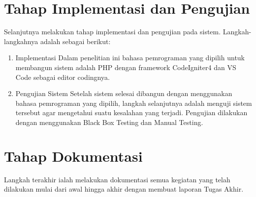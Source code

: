 \section{Tahap Implementasi dan Pengujian}
Selanjutnya melakukan tahap implementasi dan pengujian pada sistem. Langkah-langkahnya adalah sebagai berikut:
\begin{enumerate}
	\item Implementasi Dalam penelitian ini bahasa pemrograman yang dipilih untuk membangun sistem adalah PHP dengan framework CodeIgniter4 dan VS Code sebagai editor codingnya.
	\item Pengujian Sistem Setelah sistem selesai dibangun dengan menggunakan bahasa pemrograman yang dipilih, langkah selanjutnya adalah menguji sistem tersebut agar mengetahui suatu kesalahan yang terjadi. Pengujian dilakukan dengan menggunakan Black Box Testing dan Manual Testing.
\end{enumerate}

\section{Tahap Dokumentasi}
Langkah terakhir ialah melakukan dokumentasi semua kegiatan yang telah dilakukan mulai dari awal hingga akhir dengan membuat laporan Tugas Akhir.